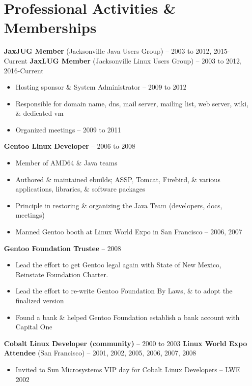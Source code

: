 \documentclass[10pt]{report}
\begin{document}
\section*{Professional Activities \& Memberships}
\textbf{JaxJUG Member} (Jacksonville Java Users Group) – 2003 to 2012, 2015-Current\newline
\textbf{JaxLUG Member} (Jacksonville Linux Users Group) – 2003 to 2012, 2016-Current
\begin{itemize}
  \item Hosting sponsor \& System Administrator – 2009 to 2012
  \item Responsible for domain name, dns, mail server, mailing list, web server, wiki, \& dedicated vm
  \item Organized meetings – 2009 to 2011
\end{itemize}
\textbf{Gentoo Linux Developer} – 2006 to 2008
\begin{itemize}
  \item Member of AMD64 \& Java teams
  \item Authored \& maintained ebuilds; ASSP, Tomcat, Firebird, \& various applications,
libraries, \& software packages
\end{itemize}
\begin{itemize}
  \item Principle in restoring \& organizing the Java Team (developers, docs, meetings)
  \item Manned Gentoo booth at Linux World Expo in San Francisco – 2006, 2007
\end{itemize}
\textbf{Gentoo Foundation Trustee} – 2008
\begin{itemize}
  \item Lead the effort to get Gentoo legal again with State of New Mexico, Reinstate Foundation Charter.
  \item Lead the effort to re-write Gentoo Foundation By Laws, \& to adopt the finalized version
  \item Found a bank \& helped Gentoo Foundation establish a bank account with Capital One
\end{itemize}
\textbf{Cobalt Linux Developer (community)} – 2000 to 2003\newline
\textbf{Linux World Expo Attendee} (San Francisco) – 2001, 2002, 2005, 2006, 2007, 2008
\begin{itemize}
  \item Invited to Sun Microsystems VIP day for Cobalt Linux Developers – LWE 2002
\end{itemize}
\end{document}
